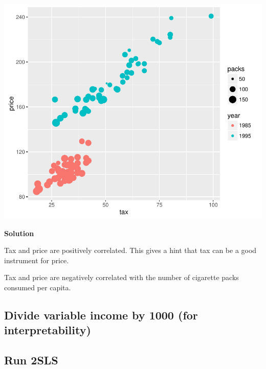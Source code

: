 \documentclass{article}
\begin{document}
\begin{knitrout}
\color{fgcolor}
\includegraphics[width=\maxwidth]{figure/unnamed-chunk-2-1} 

\end{knitrout}

\textbf{Solution}

Tax and price are positively correlated. This gives a hint that tax can be a good instrument for price.

Tax and price are negatively correlated with the number of cigarette packs consumed per capita.

\subsection{Divide variable income by 1000 (for interpretability)}

\begin{knitrout}
\color{fgcolor}\begin{kframe}
\begin{alltt}
\hlopt{$} \hlkwb{<-} \hlopt{$} \hlopt{/} 
\end{alltt}
\end{kframe}
\end{knitrout}


\subsection{Run 2SLS}
\end{document}
